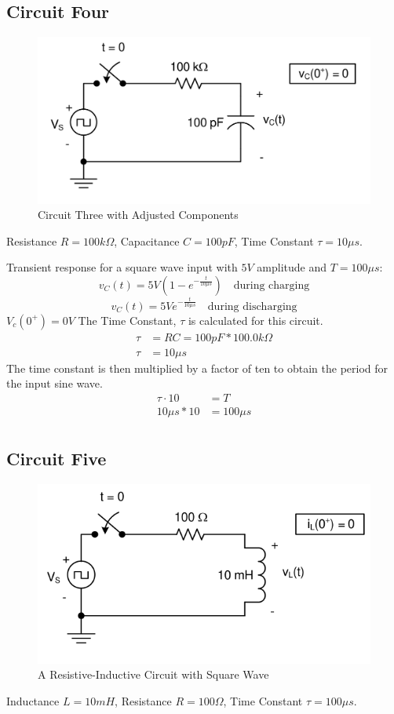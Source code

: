 \documentclass[12pt]{article}
\begin{document}
\subsection{Circuit Four}
\begin{figure}[H]
	\centering
	\includegraphics[width=14cm]{e5_4}
	\caption{Circuit Three with Adjusted Components}
\end{figure}
Resistance $R = 100k\Omega$, Capacitance $C = 100pF$, Time Constant $\tau = 10\mu s$.

Transient response for a square wave input with $5V$ amplitude and $T = 100\mu s$:
\[
	v_C(t) = 5V(1 - e^{-\frac{t}{10\mu s}}) \quad \text{during charging}
\]
\[
	v_C(t) = 5V e^{-\frac{t}{10\mu s}} \quad \text{during discharging}
\]
$V_c(0^+) = 0V$
The Time Constant, $\tau$ is calculated for this circuit.
\begin{align*}
	\tau & = RC = 100pF * 100.0k\Omega \\
	\tau & = 10\mu s
\end{align*}
The time constant is then multiplied by a factor of ten to obtain the period for
the input sine wave.
\begin{align*}
	\tau \cdot 10 & = T        \\
	10\mu s * 10  & = 100\mu s \\
\end{align*}
\subsection{Circuit Five}
\begin{figure}[H]
	\centering
	\includegraphics[width=14cm]{e5_5}
	\caption{A Resistive-Inductive Circuit with Square Wave}
\end{figure}
Inductance $L = 10mH$, Resistance $R = 100\Omega$, Time Constant $\tau = 100\mu s$.
\end{document}
